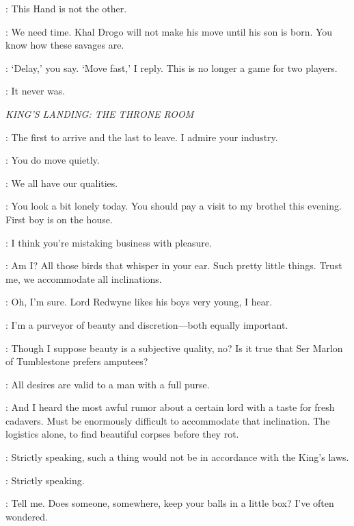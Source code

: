 \VARYS: This Hand is not the other. 

\ILLYRIO: We need time. Khal Drogo will not make his move until his son is born. You know how these savages are. 

\VARYS: `Delay,' you say. `Move fast,' I reply. This is no longer a game for two players. 

\ILLYRIO: It never was. 



\scene

\textit{KING'S LANDING: THE THRONE ROOM} 


\VARYS: The first to arrive and the last to leave. I admire your industry. 

\LITTLEFINGER: You do move quietly. 

\VARYS: We all have our qualities. 

\LITTLEFINGER: You look a bit lonely today. You should pay a visit to my brothel this evening. First boy is on the house. 

\VARYS: I think you're mistaking business with pleasure. 

\LITTLEFINGER: Am I? All those birds that whisper in your ear.  Such pretty little things. Trust me, we accommodate all inclinations. 

\VARYS: Oh, I'm sure. Lord Redwyne likes his boys very young, I hear. 

\LITTLEFINGER: I'm a purveyor of beauty and discretion---both equally important. 

\VARYS: Though I suppose beauty is a subjective quality, no? Is it true that Ser Marlon of Tumblestone prefers amputees? 

\LITTLEFINGER: All desires are valid to a man with a full purse. 

\VARYS: And I heard the most awful rumor about a certain lord with a taste for fresh cadavers. Must be enormously difficult to accommodate that inclination. The logistics alone, to find beautiful corpses before they rot. 

\LITTLEFINGER: Strictly speaking, such a thing would not be in accordance with the King's laws. 

\VARYS: Strictly speaking. 

\LITTLEFINGER: Tell me. Does someone, somewhere, keep your balls in a little box? I've often wondered. 

